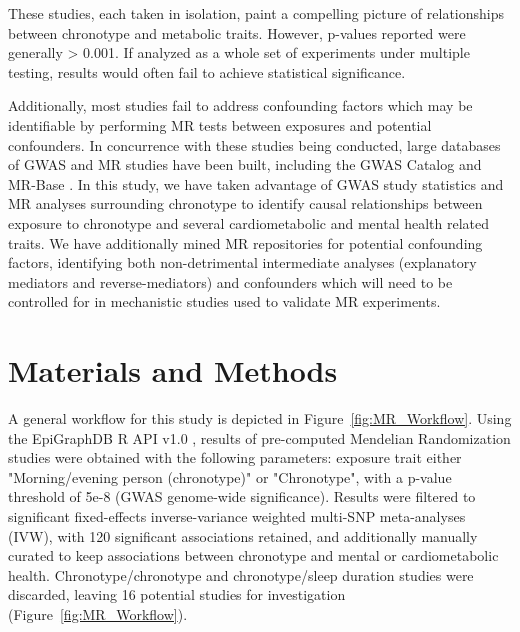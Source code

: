 \documentclass[journal,article,submit,moreauthors,pdftex]{Definitions/mdpi}
\begin{document}
These studies, each taken in isolation, paint a compelling picture of relationships between chronotype and metabolic traits. However, p-values reported were generally > 0.001. If analyzed as a whole set of experiments under multiple testing, results would often fail to achieve statistical significance. 

Additionally, most studies fail to address confounding factors which may be identifiable by performing MR tests between exposures and potential confounders. In concurrence with these studies being conducted, large databases of GWAS and MR studies have been built, including the GWAS Catalog \cite{buniello_nhgri-ebi_2019} and MR-Base \cite{hemani_mr-base_2018}. In this study, we have taken advantage of GWAS study statistics and MR analyses surrounding chronotype to identify causal relationships between exposure to chronotype and several cardiometabolic and mental health related traits. We have additionally mined MR repositories for potential confounding factors, identifying both non-detrimental intermediate analyses (explanatory mediators and reverse-mediators) and confounders which will need to be controlled for in mechanistic studies used to validate MR experiments.

\section{Materials and Methods}

A general workflow for this study is depicted in Figure~\ref{fig:MR_Workflow}. Using the EpiGraphDB R API v1.0 \cite{liu_epigraphdb_2020}, results of pre-computed Mendelian Randomization studies were obtained with the following parameters: exposure trait either "Morning/evening person (chronotype)" or "Chronotype", with a p-value threshold of 5e-8 (GWAS genome-wide significance). Results were filtered to significant fixed-effects inverse-variance weighted multi-SNP meta-analyses (IVW), with 120 significant associations retained, and additionally manually curated to keep associations between chronotype and mental or cardiometabolic health. Chronotype/chronotype and chronotype/sleep duration studies were discarded, leaving 16 potential studies for investigation (Figure~\ref{fig:MR_Workflow}).
\end{document}
